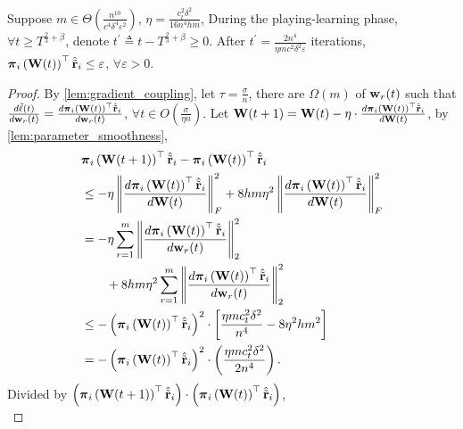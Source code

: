 \begin{thm}
\label{thm:surrogate_expected_loss_convergence}
    Suppose $m \in \Theta\left( \frac{n^{10}}{c^4 \delta^4 \varepsilon^2} \right)$, $\eta = \frac{c_t^2 \delta^2}{16 n^4 h m}$, During the playing-learning phase, $\forall t \ge T^{\frac{2}{3} + \beta}$, denote $t^\prime \triangleq t - T^{\frac{2}{3} + \beta} \ge 0$. After $t^\prime = \frac{2n^4}{\eta m c^2 \delta^2 \varepsilon}$ iterations, ${\boldsymbol{\pi}}_i\left( {\mathbf{W}}(t) \right)^\top \hat{{\tilde{\mathbf{r}}}}_i \le \varepsilon$, $\forall \varepsilon > 0$.
\end{thm}
\begin{proof}
    By \cref{lem:gradient_coupling}, let $\tau = \frac{\sigma}{n}$, there are $\Omega\left( m \right)$ of ${\mathbf{w}}_r(t)$ such that $\frac{d\tilde{\ell}(t)}{d {\mathbf{w}}_r(t)} = \frac{d {\boldsymbol{\pi}}_i\left( {\mathbf{W}}(t) \right)^\top \hat{{\tilde{\mathbf{r}}}}_i}{d {\mathbf{w}}_r(t)}$, $\forall t \in O\left( \frac{\sigma}{\eta n} \right)$. Let ${\mathbf{W}}(t+1) = {\mathbf{W}}(t) - \eta \cdot \frac{d {\boldsymbol{\pi}}_i\left( {\mathbf{W}}(t) \right)^\top \hat{{\tilde{\mathbf{r}}}}_i}{d {\mathbf{W}}(t)}$, by \cref{lem:parameter_smoothness},
\begin{equation*}
\begin{split}
    &{\boldsymbol{\pi}}_i\left( {\mathbf{W}}(t+1) \right)^\top \hat{{\tilde{\mathbf{r}}}}_i - {\boldsymbol{\pi}}_i\left( {\mathbf{W}}(t) \right)^\top \hat{{\tilde{\mathbf{r}}}}_i \\
    &\le - \eta \left\| \frac{d {\boldsymbol{\pi}}_i\left( {\mathbf{W}}(t) \right)^\top \hat{{\tilde{\mathbf{r}}}}_i}{d {\mathbf{W}}(t)} \right\|_F^2 + 8 h m \eta^2 \left\| \frac{d {\boldsymbol{\pi}}_i\left( {\mathbf{W}}(t) \right)^\top \hat{{\tilde{\mathbf{r}}}}_i}{d {\mathbf{W}}(t)} \right\|_F^2 \\
    &= - \eta \sum\limits_{r=1}^{m}{ \left\| \frac{d {\boldsymbol{\pi}}_i\left( {\mathbf{W}}(t) \right)^\top \hat{{\tilde{\mathbf{r}}}}_i}{d {\mathbf{w}}_r(t)} \right\|_2^2 } \\
    &\qquad + 8 h m \eta^2 \sum\limits_{r=1}^{m}{ \left\| \frac{d {\boldsymbol{\pi}}_i\left( {\mathbf{W}}(t) \right)^\top \hat{{\tilde{\mathbf{r}}}}_i}{d {\mathbf{w}}_r(t)} \right\|_2^2 } \\
    &\le - \left( {\boldsymbol{\pi}}_i\left( {\mathbf{W}}(t) \right)^\top \hat{{\tilde{\mathbf{r}}}}_i \right)^2 \cdot \left[ \frac{\eta m c_t^2 \delta^2}{n^4} - 8 \eta^2 h m^2 \right] \\
    &= - \left( {\boldsymbol{\pi}}_i\left( {\mathbf{W}}(t) \right)^\top \hat{{\tilde{\mathbf{r}}}}_i \right)^2 \cdot \left( \frac{\eta m c_t^2 \delta^2}{2n^4} \right).
\end{split}
\end{equation*}
Divided by $\left( {\boldsymbol{\pi}}_i\left( {\mathbf{W}}(t+1) \right)^\top \hat{{\tilde{\mathbf{r}}}}_i\right) \cdot \left( {\boldsymbol{\pi}}_i\left( {\mathbf{W}}(t) \right)^\top \hat{{\tilde{\mathbf{r}}}}_i \right)$,
\begin{equation*}

\end{equation*}
\end{proof}
